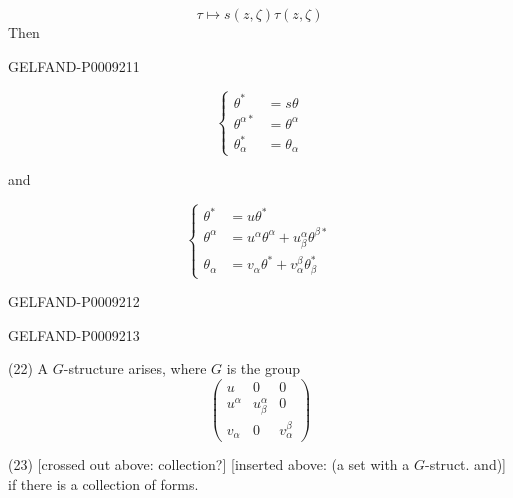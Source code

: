 \begin{equation*}
 \tau\mapsto s(z,\zeta)\tau(z,\zeta)
 \tag{19}
\end{equation*}
Then


\begin{GelfandAdjacentEvidence}{GELFAND-P000921}{1}

\begin{equation*}
 \left\{\begin{aligned}
 \theta^*&=s\theta\\
 \theta^{\alpha*}&=\theta^\alpha\\
 \theta_\alpha^*&=\theta_\alpha
 \end{aligned}\right.
 \tag{20}
\end{equation*}

and

\begin{equation*}
 \left\{\begin{aligned}
 \theta^*&=u\theta^*\\
 \theta^\alpha&=u^\alpha\theta^\alpha+u^\alpha_\beta\theta^{\beta*}\\
 \theta_\alpha&=v_\alpha\theta^*+v^\beta_\alpha\theta_\beta^*
 \end{aligned}\right.
 \tag{21}
\end{equation*}
\end{GelfandAdjacentEvidence}
\begin{GelfandAdjacentEvidence}{GELFAND-P000921}{2}

\end{GelfandAdjacentEvidence}
\begin{GelfandAdjacentEvidence}{GELFAND-P000921}{3}


(22) A $G$-structure arises, where $G$ is the group
\begin{equation*}
 \begin{pmatrix}
 u&0&0\\
 u^\alpha&u_\beta^\alpha&0\\
 v_\alpha&0&v_\alpha^\beta
 \end{pmatrix}
\end{equation*}

(23) 
[crossed out above: collection?]
[inserted above: (a set with a $G$-struct. and)]
if there is a collection of forms.
\end{GelfandAdjacentEvidence}
